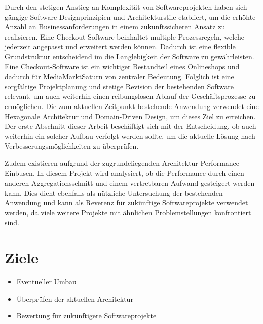 
Durch den stetigen Anstieg an Komplexität von Softwareprojekten haben sich gängige Software Designprinzipien und Architekturstile etabliert, um die erhöhte Anzahl an Businessanforderungen in einem zukunftssicheren Ansatz zu realisieren. Eine Checkout-Software beinhaltet multiple Prozessregeln, welche jederzeit angepasst und erweitert werden können. Dadurch ist eine flexible Grundstruktur entscheidend im die Langlebigkeit der Software zu gewährleisten. Eine Checkout-Software ist ein wichtiger Bestandteil eines Onlineshops und dadurch für MediaMarktSaturn von zentraler Bedeutung. Folglich ist eine sorgfältige Projektplanung und stetige Revision der bestehenden Software relevant, um auch weiterhin einen reibungslosen Ablauf der Geschäftsprozesse zu ermöglichen. Die zum aktuellen Zeitpunkt bestehende Anwendung verwendet eine Hexagonale Architektur und Domain-Driven Design, um dieses Ziel zu erreichen. Der erste Abschnitt dieser Arbeit beschäftigt sich mit der Entscheidung, ob auch weiterhin ein solcher Aufbau verfolgt werden sollte, um die aktuelle Lösung nach Verbesserungsmöglichkeiten zu überprüfen. 

Zudem existieren aufgrund der zugrundeliegenden Architektur Performance-Einbusen. In diesem Projekt wird analysiert, ob die Performance durch einen anderen Aggregationsschnitt und einem vertretbaren Aufwand gesteigert werden kann. Dies dient ebenfalls als nützliche Untersuchung der bestehenden Anwendung und kann als Reverenz für zukünftige Softwareprojekte verwendet werden, da viele weitere Projekte mit ähnlichen Problemstellungen konfrontiert sind.



\section{Ziele}
\begin{itemize}[noitemsep,nolistsep]
	\item Eventueller Umbau
	\item Überprüfen der aktuellen Architektur
	\item Bewertung für zukünftigere Softwareprojekte
\end{itemize}

